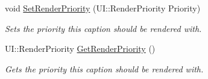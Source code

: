 \begin{DoxyCompactItemize}
void \hyperlink{classphys_1_1UI_1_1Caption_a27e71736c847ff6e50be7191e3db5225}{SetRenderPriority} (UI::RenderPriority Priority)
\begin{DoxyCompactList}\small\item\em Sets the priority this caption should be rendered with. \item\end{DoxyCompactList}\item 
UI::RenderPriority \hyperlink{classphys_1_1UI_1_1Caption_ada0bf1e830f8f672adbc3263e7095896}{GetRenderPriority} ()
\begin{DoxyCompactList}\small\item\em Gets the priority this caption should be rendered with. \item\end{DoxyCompactList}\end{DoxyCompactItemize}
